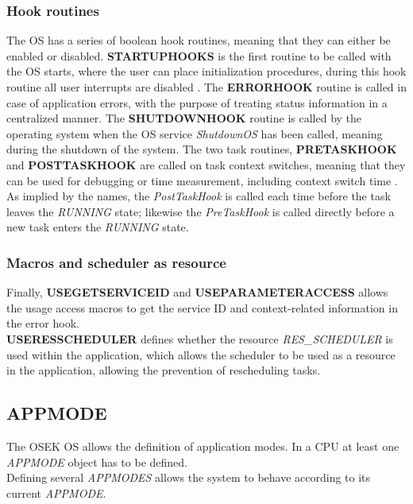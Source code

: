 \subsubsection*{Hook routines}
The OS has a series of boolean hook routines, meaning that they can either be enabled or disabled. 
\textbf{STARTUPHOOKS} is the first routine to be called with the OS starts, where the user can place initialization procedures, during this hook routine all user interrupts are disabled \cite{irisa223}.
The \textbf{ERRORHOOK} routine is called in case of application errors, with the purpose of treating status information in a centralized manner. 
The \textbf{SHUTDOWNHOOK} routine is called by the operating system when the OS service \textit{ShutdownOS} has been called, meaning during the shutdown of the system. 
The two task routines, \textbf{PRETASKHOOK} and \textbf{POSTTASKHOOK} are called on task context switches, meaning that they can be used for debugging or time measurement, including context switch time \cite{irisa223}.
As implied by the names, the \textit{PostTaskHook} is called each time before the task leaves the \textit{RUNNING} state; likewise the \textit{PreTaskHook} is called directly before a new task enters the \textit{RUNNING} state\cite{irisa223}.

\subsubsection*{Macros and scheduler as resource}
Finally, \textbf{USEGETSERVICEID} and \textbf{USEPARAMETERACCESS} allows the usage access macros to get the service ID and context-related information in the error hook.\\
\textbf{USERESSCHEDULER} defines whether the resource \textit{RES\_SCHEDULER} is used within the application, which allows the scheduler to be used as a resource in the application, allowing the prevention of rescheduling tasks\cite{irisa223}.

\subsection{APPMODE}
The OSEK OS allows the definition of application modes. In a CPU at least one \textit{APPMODE} object has to be defined.\\
Defining several \textit{APPMODES} allows the system to behave according to its current \textit{APPMODE}\cite{irisa25}.

